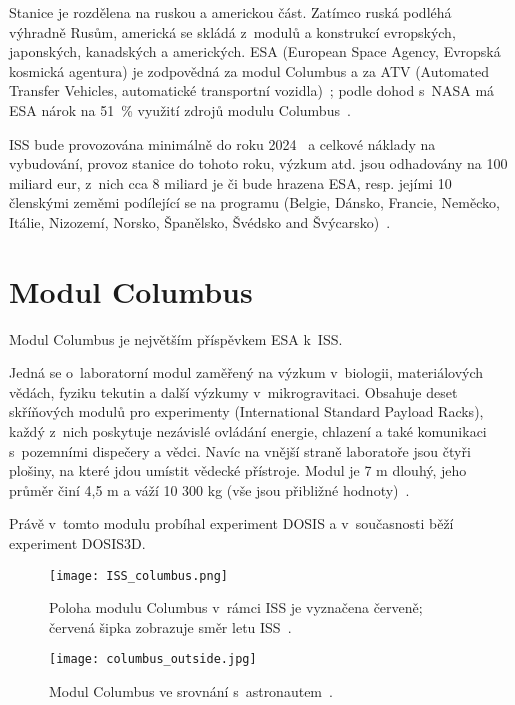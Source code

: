 Stanice je rozdělena na ruskou a americkou část. Zatímco ruská podléhá výhradně Rusům, americká se skládá z~modulů a konstrukcí evropských, japonských, kanadských a amerických. ESA (European Space Agency, Evropská kosmická agentura) je zodpovědná za modul Columbus a za ATV (Automated Transfer Vehicles, automatické transportní vozidla)~\cite{ISS_about}; podle dohod s~NASA má ESA nárok na 51~\% využití zdrojů modulu Columbus~\cite{ISS_wiki}.

ISS bude provozována minimálně do roku 2024~\cite{ISS_prodlouzeni} a celkové náklady na vybudování, provoz stanice do tohoto roku, výzkum atd. jsou odhadovány na 100 miliard eur, z~nich cca 8 miliard je či bude hrazena ESA, resp. jejími 10 členskými zeměmi podílející se na programu (Belgie, Dánsko, Francie, Neměcko, Itálie, Nizozemí, Norsko, Španělsko, Švédsko and Švýcarsko)~\cite{ISS_cost}.
\section{Modul Columbus}\label{sec:ISS_columbus}
Modul Columbus je největším příspěvkem ESA k~ISS.

Jedná se o~laboratorní modul zaměřený na výzkum v~biologii, materiálových vědách, fyziku tekutin a další výzkumy v~mikrogravitaci. Obsahuje deset skříňových modulů pro experimenty (International Standard Payload Racks), každý z~nich poskytuje nezávislé ovládání energie, chlazení a také komunikaci s~pozemními dispečery a vědci. Navíc na vnější straně laboratoře jsou čtyři plošiny, na které jdou umístit vědecké přístroje. Modul je 7 m dlouhý, jeho průměr činí 4,5 m a váží 10 300 kg (vše jsou přibližné hodnoty)~\cite{columbus}.

Právě v~tomto modulu probíhal experiment DOSIS a v~současnosti běží experiment DOSIS3D. 
\begin{figure}[H]
  \centering
  \texttt{[image: ISS\_columbus.png]}
  \caption{Poloha modulu Columbus v~rámci ISS je vyznačena červeně; červená šipka zobrazuje směr letu ISS~\cite{dosis}.}
  \label{fig:columbus_poloha}
\end{figure}
\begin{figure}[H]
  \centering
  \texttt{[image: columbus\_outside.jpg]}
  \caption{Modul Columbus ve srovnání s~astronautem~\cite{columbus_outside}.}
  \label{fig:columbus_srovnani}
\end{figure}

